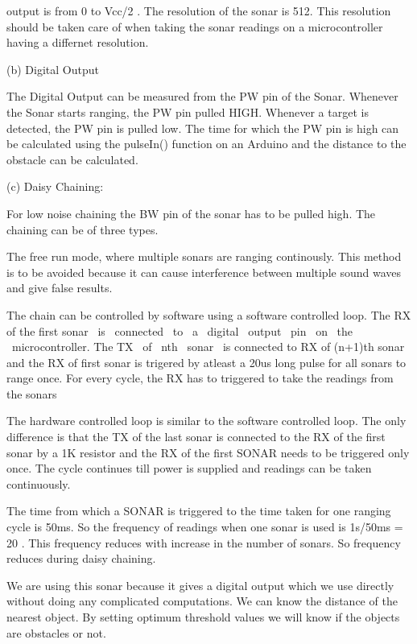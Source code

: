 \documentclass[11pt]{report}
\begin{document}
{{
output is from 0 to Vcc/2 . The resolution of the sonar is 512. This
resolution should be taken care of when taking the sonar readings on a
microcontroller having a differnet resolution.}


\bigskip

{
(b) Digital Output}

{
The Digital Output can be measured from the PW pin of the Sonar.
Whenever the Sonar starts ranging, the PW pin pulled HIGH. Whenever a
target is detected, the PW pin is pulled low. The time for which the PW
pin is high can be calculated using the pulseIn() function on an
Arduino and the distance to the obstacle can be calculated.}


(c) Daisy Chaining:

{
For low noise chaining the BW pin of the sonar has to be pulled high.
The chaining can be of three types.




 The free run mode, where multiple sonars are ranging continously. This
method is to be avoided because it can cause interference between
multiple sound waves and give false results.

 The chain can be controlled by software using a software controlled
loop. The RX of the first sonar \ is \ connected \ to \ a \ digital
\ output \ pin \ on \ the \ microcontroller. The TX \ of \ nth \ sonar
\ is connected to RX of (n+1)th sonar and the RX of first sonar is
trigered by atleast a 20us long pulse for all sonars to range once. For
every cycle, the RX has to triggered to take the readings from the
sonars

The hardware controlled loop is similar to the software controlled loop.
The only difference is that the TX of the last sonar is connected to
the RX of the first sonar by a 1K resistor and the RX of the first
SONAR needs to be triggered only once. The cycle continues till power
is supplied and readings can be taken continuously.


The time from which a SONAR is triggered to the time taken for one
ranging cycle is 50ms. So the frequency of readings when one sonar is
used is 1s/50ms = 20 . This frequency reduces with increase in the
number of sonars. So frequency reduces during daisy chaining.

We are using this sonar because it gives a digital output
which we  use directly without doing any complicated computations. We
can know  the distance of the nearest object. By setting optimum
threshold values we will know if the objects are obstacles or not.


}}
\end{document}
